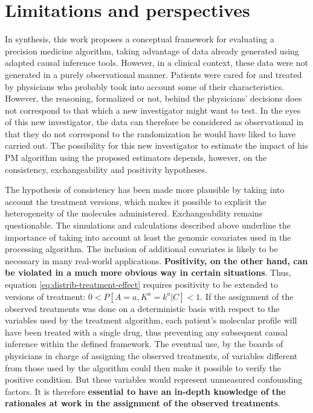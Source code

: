 \documentclass[a4paper,12pt,twoside,onecolumn,openright,final,oldfontcommands]{memoir}
\begin{document}
\section{Limitations and
perspectives}\label{limitations-and-perspectives-1}

In synthesis, this work proposes a conceptual framework for evaluating a
precision medicine algorithm, taking advantage of data already generated
using adapted causal inference tools. However, in a clinical context,
these data were not generated in a purely observational manner. Patients
were cared for and treated by physicians who probably took into account
some of their characteristics. However, the reasoning, formalized or
not, behind the physicians' decisions does not correspond to that which
a new investigator might want to test. In the eyes of this new
investigator, the data can therefore be considered as observational in
that they do not correspond to the randomization he would have liked to
have carried out. The possibility for this new investigator to estimate
the impact of his PM algorithm using the proposed estimators depends,
however, on the consistency, exchangeability and positivity hypotheses.

The hypothesis of consistency has been made more plausible by taking
into account the treatment versions, which makes it possible to explicit
the heterogeneity of the molecules administered. Exchangeability remains
questionable. The simulations and calculations described above underline
the importance of taking into account at least the genomic covariates
used in the processing algorithm. The inclusion of additional covariates
is likely to be necessary in many real-world applications.
\textbf{Positivity, on the other hand, can be violated in a much more
obvious way in certain situations}. Thus, equation
\eqref{eq:distrib-treatment-effect} requires positivity to be extended to
versions of treatment: \(0<P[A=a, K^a=k^a|C]<1\). If the assignment of
the observed treatments was done on a deterministic basis with respect
to the variables used by the treatment algorithm, each patient's
molecular profile will have been treated with a single drug, thus
preventing any subsequent causal inference within the defined framework.
The eventual use, by the boards of physicians in charge of assigning the
observed treatments, of variables different from those used by the
algorithm could then make it possible to verify the positive condition.
But these variables would represent unmeasured confounding factors. It
is therefore \textbf{essential to have an in-depth knowledge of the
rationales at work in the assignment of the observed treatments}.
\end{document}

